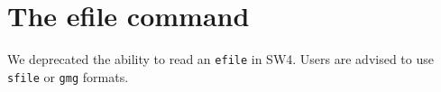 \documentclass[11pt]{report}
\begin{document}
\section{The efile command} \label{sec:efile}
We deprecated the ability to read an \verb+efile+ in SW4. Users are advised to use \verb+sfile+ or \verb+gmg+ formats.
\end{document}
